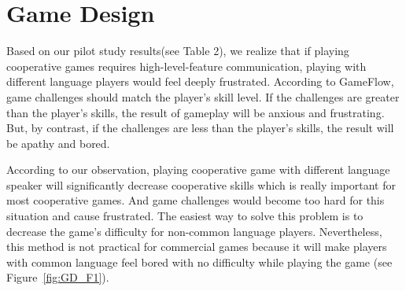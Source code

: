 \section{Game Design}


Based on our pilot study results(see Table 2), we realize that if playing cooperative games requires high-level-feature communication, playing with different language players would feel deeply frustrated. According to GameFlow\cite{GD1}, game challenges should match the player's skill level. If the challenges are greater than the player's skills, the result of gameplay will be anxious and frustrating. But, by contrast, if the challenges are less than the player's skills, the result will be apathy and bored.


According to our observation, playing cooperative game with different language speaker will significantly decrease cooperative skills which is really important for most cooperative games. And game challenges would become too hard for this situation and cause frustrated. The easiest way to solve this problem is to decrease the game's difficulty for non-common language players. Nevertheless, this method is not practical for commercial games because it will make players with common language feel bored with no difficulty while playing the game (see Figure~\ref{fig:GD_F1}).  

